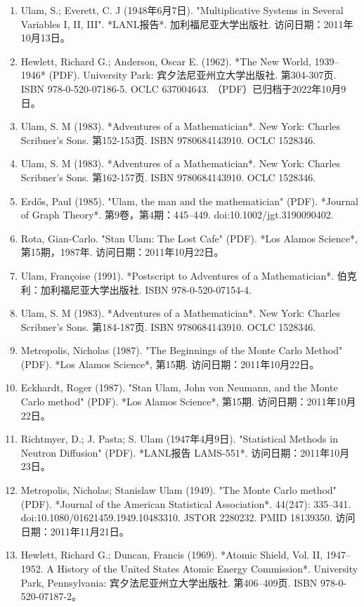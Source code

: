 \begin{enumerate}
\item Ulam, S.; Everett, C. J (1948年6月7日). "Multiplicative Systems in Several Variables I, II, III". *LANL报告*. 加利福尼亚大学出版社. 访问日期：2011年10月13日。
\item Hewlett, Richard G.; Anderson, Oscar E. (1962). *The New World, 1939–1946* (PDF). University Park: 宾夕法尼亚州立大学出版社. 第304-307页. ISBN 978-0-520-07186-5. OCLC 637004643. （PDF）已归档于2022年10月9日。
\item Ulam, S. M (1983). *Adventures of a Mathematician*. New York: Charles Scribner's Sons. 第152-153页. ISBN 9780684143910. OCLC 1528346.
\item Ulam, S. M (1983). *Adventures of a Mathematician*. New York: Charles Scribner's Sons. 第162-157页. ISBN 9780684143910. OCLC 1528346.
\item Erdős, Paul (1985). "Ulam, the man and the mathematician" (PDF). *Journal of Graph Theory*. 第9卷，第4期：445–449. doi:10.1002/jgt.3190090402.
\item Rota, Gian-Carlo. "Stan Ulam: The Lost Cafe" (PDF). *Los Alamos Science*, 第15期，1987年. 访问日期：2011年10月22日。
\item Ulam, Françoise (1991). *Postscript to Adventures of a Mathematician*. 伯克利：加利福尼亚大学出版社. ISBN 978-0-520-07154-4.
\item Ulam, S. M (1983). *Adventures of a Mathematician*. New York: Charles Scribner's Sons. 第184-187页. ISBN 9780684143910. OCLC 1528346.
\item Metropolis, Nicholas (1987). "The Beginnings of the Monte Carlo Method" (PDF). *Los Alamos Science*, 第15期. 访问日期：2011年10月22日。
\item Eckhardt, Roger (1987). "Stan Ulam, John von Neumann, and the Monte Carlo method" (PDF). *Los Alamos Science*, 第15期. 访问日期：2011年10月22日。
\item Richtmyer, D.; J. Pasta; S. Ulam (1947年4月9日). "Statistical Methods in Neutron Diffusion" (PDF). *LANL报告 LAMS-551*. 访问日期：2011年10月23日。
\item Metropolis, Nicholas; Stanislaw Ulam (1949). "The Monte Carlo method" (PDF). *Journal of the American Statistical Association*. 44(247): 335–341. doi:10.1080/01621459.1949.10483310. JSTOR 2280232. PMID 18139350. 访问日期：2011年11月21日。
\item Hewlett, Richard G.; Duncan, Francis (1969). *Atomic Shield, Vol. II, 1947–1952. A History of the United States Atomic Energy Commission*. University Park, Pennsylvania: 宾夕法尼亚州立大学出版社. 第406–409页. ISBN 978-0-520-07187-2。

\end{enumerate}
